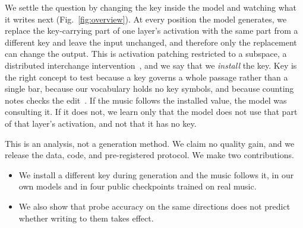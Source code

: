 \documentclass{article}
\begin{document}
We settle the question by changing the key inside the model and watching what it writes next (Fig.~\ref{fig:overview}).
At every position the model generates, we replace the key-carrying part of one layer's activation with the same part from a different key and leave the input unchanged, and therefore only the replacement can change the output.
This is activation patching restricted to a subspace, a distributed interchange intervention~\cite{geiger2024das}, and we say that we \emph{install} the key.
Key is the right concept to test because a key governs a whole passage rather than a single bar, because our vocabulary holds no key symbols, and because counting notes checks the edit~\cite{krumhansl1990,temperley1999ks}.
If the music follows the installed value, the model was consulting it.
If it does not, we learn only that the model does not use that part of that layer's activation, and not that it has no key.

This is an analysis, not a generation method.
We claim no quality gain, and we release the data, code, and pre-registered protocol.
We make two contributions.
\begin{itemize}
\item We install a different key during generation and the music follows it, in our own models and in four public checkpoints trained on real music.
\item We also show that probe accuracy on the same directions does not predict whether writing to them takes effect.
\end{itemize}
\end{document}

